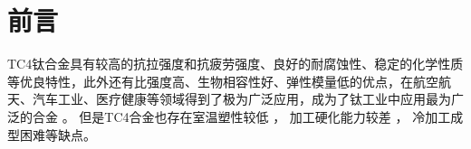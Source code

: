 \documentclass[
class = book,
zihao = -4,
font = noto,
paper = a4paper,
openany
]{easybook}
\begin{document}
\chapter{前言}
%
%

TC4钛合金具有较高的抗拉强度和抗疲劳强度、良好的耐腐蚀性、稳定的化学性质等优良特性，此外还有比强度高、生物相容性好、弹性模量低的优点，在航空航天、汽车工业、医疗健康等领域得到了极为广泛应用，成为了钛工业中应用最为广泛的合金 。 但是TC4合金也存在室温塑性较低 ， 加工硬化能力较差 ， 冷加工成型困难等缺点。
\end{document}
